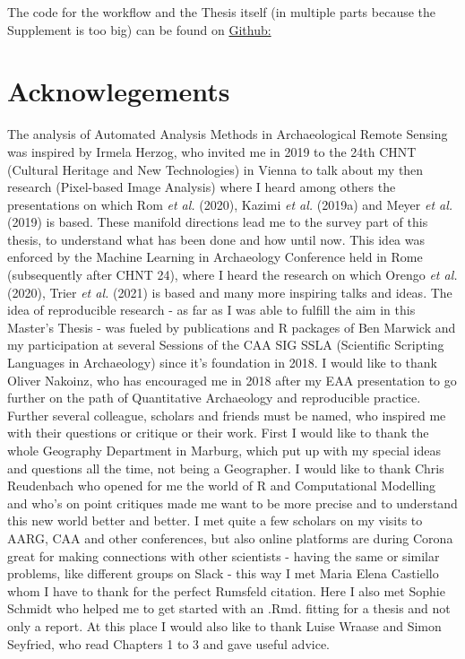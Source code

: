 \documentclass[
  12pt,
]{article}
\begin{document}
The code for the workflow and the Thesis itself (in multiple parts because the Supplement is too big) can be found on \href{https://github.com/keltoskytoi/iSEGMound}{Github:}

\newpage

\vspace{5mm}
\justifying

\hypertarget{acknowlegements}{%
\section*{Acknowlegements}\label{acknowlegements}}

The analysis of Automated Analysis Methods in Archaeological Remote Sensing was inspired by Irmela Herzog, who invited me in 2019 to the 24th CHNT (Cultural Heritage and New Technologies) in Vienna to talk about my then research (Pixel-based Image Analysis) where I heard among others the presentations on which Rom \emph{et al.} (2020), Kazimi \emph{et al.} (2019a) and Meyer \emph{et al.} (2019) is based. These manifold directions lead me to the survey part of this thesis, to understand what has been done and how until now. This idea was enforced by the Machine Learning in Archaeology Conference held in Rome (subsequently after CHNT 24), where I heard the research on which Orengo \emph{et al.} (2020), Trier \emph{et al.} (2021) is based and many more inspiring talks and ideas.
\newline
The idea of reproducible research - as far as I was able to fulfill the aim in this Master's Thesis - was fueled by publications and R packages of Ben Marwick and my participation at several Sessions of the CAA SIG SSLA (Scientific Scripting Languages in Archaeology) since it's foundation in 2018. I would like to thank Oliver Nakoinz, who has encouraged me in 2018 after my EAA presentation to go further on the path of Quantitative Archaeology and reproducible practice.
\newline
Further several colleague, scholars and friends must be named, who inspired me with their questions or critique or their work. First I would like to thank the whole Geography Department in Marburg, which put up with my special ideas and questions all the time, not being a Geographer. I would like to thank Chris Reudenbach who opened for me the world of R and Computational Modelling and who's on point critiques made me want to be more precise and to understand this new world better and better.
I met quite a few scholars on my visits to AARG, CAA and other conferences, but also online platforms are during Corona great for making connections with other scientists - having the same or similar problems, like different groups on Slack - this way I met Maria Elena Castiello whom I have to thank for the perfect Rumsfeld citation. Here I also met Sophie Schmidt who helped me to get started with an .Rmd. fitting for a thesis and not only a report. At this place I would also like to thank Luise Wraase and Simon Seyfried, who read Chapters 1 to 3 and gave useful advice.
\end{document}
